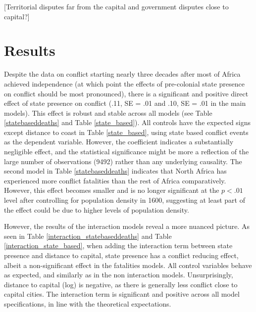 \documentclass[12pt]{article}
\begin{document}
[Territorial disputes far from the capital and government disputes close to
capital?]

\section{Results} \label{Results}

Despite the data on conflict starting nearly three decades after most of Africa
achieved independence (at which point the effects of pre-colonial state presence
on conflict should be most pronounced), there is a significant
and positive direct effect of state presence on conflict (.11, SE = .01 and .10,
SE = .01 in the main models). This effect is robust and stable across all models
(see Table \ref{statebaseddeaths} and Table \ref{state_based}). All controls
have the expected signs except distance to coast in Table \ref{state_based},
using state based conflict events as the dependent variable. However, the
coefficient indicates a substantially negligible effect, and the statistical
significance might be more a reflection of the large number of observations
(9492) rather than any underlying causality. The second model in Table
\ref{statebaseddeaths} indicates that North Africa has experienced more conflict
fatalities than the rest of Africa comparatively. However, this effect becomes
smaller and is no longer significant at the $ p < .01 $ level after controlling
for population density in 1600, suggesting at least part of the effect could be
due to higher levels of population density.

However, the results of the interaction models reveal a more nuanced picture. As
seen in Table \ref{interaction_statebaseddeaths} and Table
\ref{interaction_state_based}, when adding the interaction term between state
presence and distance to capital, state presence has a conflict reducing effect,
albeit a non-significant effect in the fatalities models. All control variables
behave as expected, and similarly as in the non interaction models.
Unsurprisingly, distance to capital (log) is negative, as there is generally
less conflict close to capital cities. The interaction term is significant
and positive across all model specifications, in line with the theoretical
expectations. 
\end{document}
